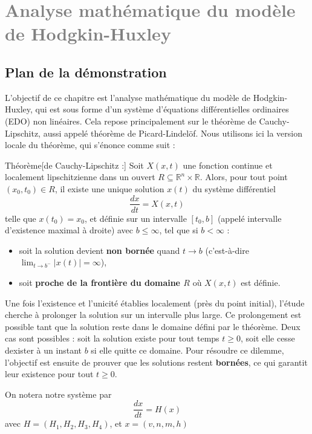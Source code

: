 \chapter{\textcolor{gray}{Analyse mathématique du modèle de Hodgkin-Huxley}}

\section{Plan de la démonstration \cite{brady2000hodgkin} \cite{dayan2001theoretical} \cite{coddington1955theory}}
	L'objectif de ce chapitre est l'analyse mathématique du modèle de Hodgkin-Huxley, qui est sous forme d'un système d'équations différentielles ordinaires (EDO) non linéaires. 
	Cela repose principalement sur le théorème de Cauchy-Lipschitz, aussi appelé théorème de Picard-Lindelöf. Nous utilisons ici la version locale du théorème, qui s'énonce comme suit :
\begin{theorem}{Théorème}[de Cauchy-Lipschitz :]
		Soit $X(x,t)$ une fonction continue et localement lipschitzienne dans un ouvert $R \subseteq \mathbb{R}^n \times \mathbb{R}$. Alors, pour tout point $(x_0, t_0) \in R$, il existe une unique solution $x(t)$ du système différentiel
		\[
		\frac{dx}{dt} = X(x,t)
		\]
		telle que $x(t_0) = x_0$, et définie sur un intervalle $[t_0, b]$ (appelé intervalle d'existence maximal à droite) avec $b \leq \infty$, tel que si $b < \infty$ :
		\begin{itemize}
			\item[-] soit la solution devient \textbf{non bornée} quand $t \rightarrow b$ (c'est-à-dire $\lim_{t \to b^-} |x(t)| = \infty$), 
			\item[-] soit \textbf{proche de la frontière du domaine $R$} où $X(x,t)$ est définie.
		\end{itemize}
\end{theorem}
	
	Une fois l'existence et l'unicité établies localement (près du point initial), l'étude cherche à prolonger la solution sur un intervalle plus large. Ce prolongement est possible tant que la solution reste dans le domaine défini par le théorème. Deux cas sont possibles : soit la solution existe pour tout temps $t \geq 0$, soit elle cesse dexister à un instant $b$ si elle quitte ce domaine. Pour résoudre ce dilemme, l'objectif est ensuite de prouver que les solutions restent \textbf{bornées}, ce qui garantit leur existence pour tout $t \geq 0$.
	
	On notera notre système par
	\begin{equation}
	\frac{dx}{dt}=H(x)
	\label{eq:20}
	\end{equation}
	avec $H=(H_1, H_2, H_3,H_4)$, et $x=(v,n,m,h)$

